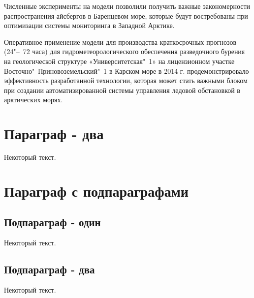 Численные эксперименты на модели позволили получить важные закономерности распространения айсбергов в Баренцевом море, которые будут востребованы при оптимизации системы мониторинга в Западной Арктике.

Оперативное применение модели для производства краткосрочных прогнозов (24"--~72 часа) для гидрометеорологического обеспечения разведочного бурения на геологической структуре «Университетская"~1» на лицензионном участке Восточно"~Приновоземельский"~1 в Карском море в 2014 г. продемонстрировало эффективность разработанной технологии, которая может стать важными блоком при создании автоматизированной системы управления ледовой обстановкой в арктических морях.


\section{Параграф - два} \label{sect4_2}

Некоторый текст.


\section{Параграф с подпараграфами} \label{sect4_3}

\subsection{Подпараграф - один} \label{subsect4_4_1}

Некоторый текст.

\subsection{Подпараграф - два} \label{subsect4_4_2}

Некоторый текст.

\clearpage